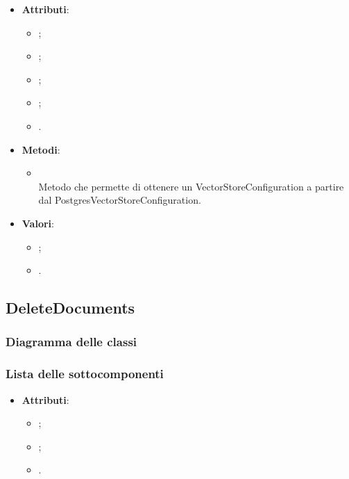 \documentclass[10pt, a4paper]{article}
\begin{document}
\label{PostgresVectorStoreConfigurationDettaglio}
\begin{itemize}
    \item \textbf{Attributi}:
    \begin{itemize}
        \item {};
        \item {};
        \item {};
        \item {};
        \item {}.  
    \end{itemize}
    \item \textbf{Metodi}:
    \begin{itemize}
        \item {}\\ 
        Metodo che permette di ottenere un VectorStoreConfiguration a partire dal PostgresVectorStoreConfiguration.
    \end{itemize}
\end{itemize}

\label{PostgresVectorStoreTypeDettaglio}
\begin{itemize}
    \item \textbf{Valori}:
    \begin{itemize}
        \item {};
        \item {}. 
    \end{itemize}
\end{itemize}



\subsection{DeleteDocuments}
\subsubsection{Diagramma delle classi}
\subsubsection{Lista delle sottocomponenti}


\label{AWSDocumentOperationResponseDettaglio}
\begin{itemize}
    \item \textbf{Attributi}:
    \begin{itemize}
        \item {};
        \item {};
        \item {}.
    \end{itemize}
\end{itemize}
\end{document}
